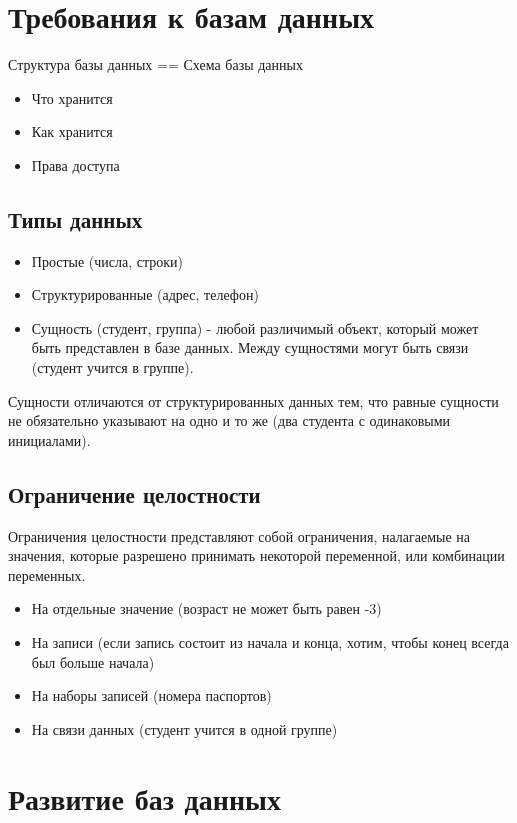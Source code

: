\documentclass{amsart}
\begin{document}

\section{Требования к базам данных}

Структура базы данных == Схема базы данных
\begin{itemize}
  \item Что хранится
  \item Как хранится
  \item Права доступа
\end{itemize}

\subsection{Типы данных}
\begin{itemize}
  \item Простые (числа, строки)
  \item Структурированные (адрес, телефон)
  \item Сущность (студент, группа) - любой различимый объект, который может быть представлен в базе данных. Между сущностями могут быть связи (студент учится в группе).
\end{itemize}
 Сущности отличаются от структурированных данных тем, что равные сущности не обязательно указывают на одно и то же (два студента с одинаковыми инициалами).

\subsection{Ограничение целостности}
Ограничения целостности представляют собой ограничения, налагаемые на
значения, которые разрешено принимать некоторой переменной, или комбинации переменных.
\begin{itemize}
  \item На отдельные значение (возраст не может быть равен -3)
  \item На записи (если запись состоит из начала и конца, хотим, чтобы конец всегда был больше начала)
  \item На наборы записей (номера паспортов)
  \item На связи данных (студент учится в одной группе)
\end{itemize}

\section{Развитие баз данных}
\end{document}
